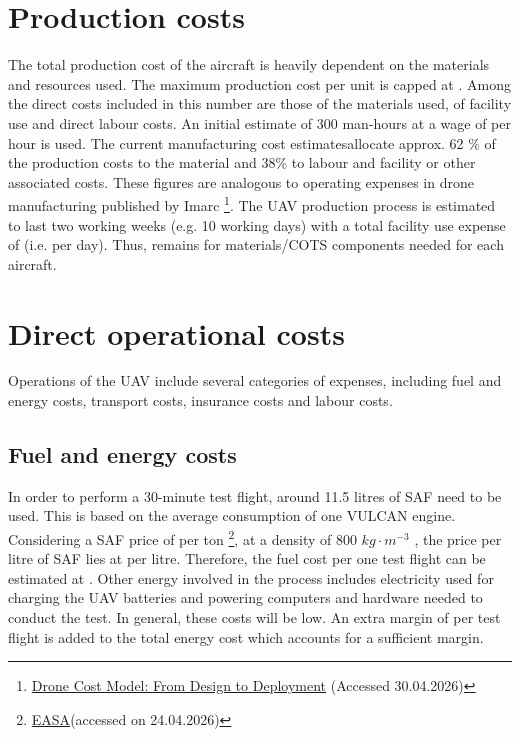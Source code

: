 \section{Production costs}
\label{sec: ProdCosts}
The total production cost of the aircraft is heavily dependent on the materials and resources used. The maximum production cost per unit is capped at  \cite{Castro2026}. Among the direct costs included in this number are those of the materials used, of facility use and direct labour costs. An initial estimate of 300 man-hours at a wage of  per hour is used. The current manufacturing cost estimatesallocate approx. 62 \% of the production costs to the material and 38\% to labour and facility or other associated costs. These figures are analogous to operating expenses in drone manufacturing published by Imarc \footnote{\href{https://www.imarcgroup.com/insight/drone-cost-model}{Drone Cost Model: From Design to Deployment} (Accessed 30.04.2026)}. The UAV production process is estimated to last two working weeks (e.g. 10 working days) with a total facility use expense of  (i.e.  per day). Thus,  remains for materials/COTS components needed for each aircraft.

\section{Direct operational costs}
Operations of the UAV include several categories of expenses, including fuel and energy costs, transport costs, insurance costs and labour costs.
\subsection{Fuel and energy costs}
In order to perform a 30-minute test flight, around 11.5 litres of SAF need to be used. This is based on the average consumption of one VULCAN engine. Considering a SAF price of  per ton \footnote{\href{https://www.easa.europa.eu/en/domains/environment/eaer/sustainable-aviation-fuels/saf-market#saf-price}{EASA}(accessed on 24.04.2026)}, at a density of 800 $kg \cdot m^{-3}$ \cite{Wang2024}, the price per litre of SAF lies at  per litre. Therefore, the fuel cost per one test flight can be estimated at . Other energy involved in the process includes electricity used for charging the UAV batteries and powering computers and hardware needed to conduct the test. In general, these costs will be low. An extra margin of  per test flight is added to the total energy cost which accounts for a sufficient margin.
